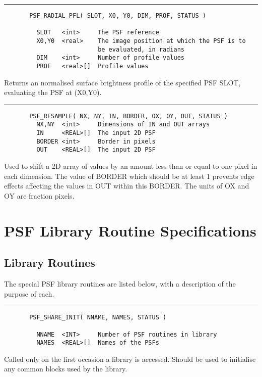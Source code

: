 \rule{\textwidth}{0.5mm}
\begin{verbatim}
       PSF_RADIAL_PFL( SLOT, X0, Y0, DIM, PROF, STATUS )

         SLOT   <int>     The PSF reference
         X0,Y0  <real>    The image position at which the PSF is to
                          be evaluated, in radians
         DIM    <int>     Number of profile values
         PROF   <real>[]  Profile values
\end{verbatim}

         Returns an normalised surface brightness profile of the
         specified PSF SLOT, evaluating the PSF at (X0,Y0).

\rule{\textwidth}{0.5mm}
\begin{verbatim}
       PSF_RESAMPLE( NX, NY, IN, BORDER, OX, OY, OUT, STATUS )
         NX,NY  <int>     Dimensions of IN and OUT arrays
         IN     <REAL>[]  The input 2D PSF
         BORDER <int>     Border in pixels 
         OUT    <REAL>[]  The input 2D PSF
\end{verbatim}

         Used to shift a 2D array of values by an amount less than
         or equal to one pixel in each dimension. The value of
         BORDER which should be at least 1 prevents edge effects
         affecting the values in OUT within this BORDER. The units
         of OX and OY are fraction pixels.

\section{PSF Library Routine Specifications}

\subsection{Library Routines}

    The special PSF library routines are listed below, with a
    description of the purpose of each.

\rule{\textwidth}{0.5mm}
\begin{verbatim}
       PSF_SHARE_INIT( NNAME, NAMES, STATUS )

         NNAME  <INT>     Number of PSF routines in library
         NAMES  <REAL>[]  Names of the PSFs
\end{verbatim}

       Called only on the first occasion a library is accessed. 
       Should be used to initialise any common blocks used by
       the library.

